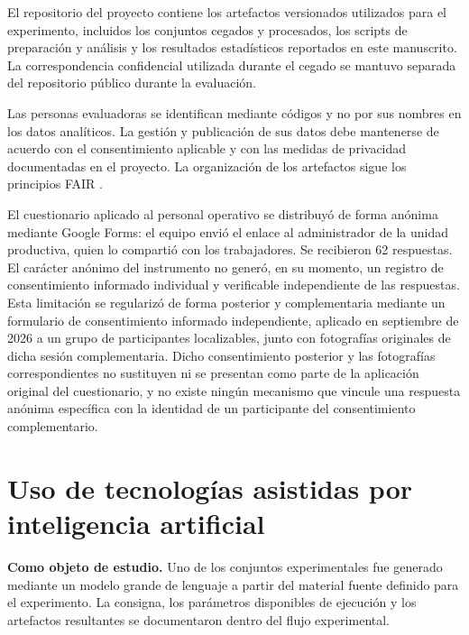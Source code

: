 \documentclass[runningheads]{llncs}
\begin{document}
El repositorio del proyecto contiene los artefactos versionados utilizados para
el experimento, incluidos los conjuntos cegados y procesados, los scripts de
preparaci\'on y an\'alisis y los resultados estad\'isticos reportados en este
manuscrito. La correspondencia confidencial utilizada durante el cegado se
mantuvo separada del repositorio p\'ublico durante la evaluaci\'on.

Las personas evaluadoras se identifican mediante c\'odigos y no por sus nombres
en los datos anal\'iticos. La gesti\'on y publicaci\'on de sus datos debe mantenerse
de acuerdo con el consentimiento aplicable y con las medidas de privacidad
documentadas en el proyecto. La organizaci\'on de los artefactos sigue los
principios FAIR \cite{wilkinson2016}.

El cuestionario aplicado al personal operativo se distribuy\'o de forma
an\'onima mediante Google Forms: el equipo envi\'o el enlace al administrador
de la unidad productiva, quien lo comparti\'o con los trabajadores. Se
recibieron 62 respuestas. El car\'acter an\'onimo del instrumento no gener\'o,
en su momento, un registro de consentimiento informado individual y
verificable independiente de las respuestas. Esta limitaci\'on se
regulariz\'o de forma posterior y complementaria mediante un formulario de
consentimiento informado independiente, aplicado en septiembre de 2026 a un
grupo de participantes localizables, junto con fotograf\'ias originales de
dicha sesi\'on complementaria. Dicho consentimiento posterior y las
fotograf\'ias correspondientes no sustituyen ni se presentan como parte de
la aplicaci\'on original del cuestionario, y no existe ning\'un mecanismo que
vincule una respuesta an\'onima espec\'ifica con la identidad de un
participante del consentimiento complementario.

\section*{Uso de tecnolog\'ias asistidas por inteligencia artificial}

\textbf{Como objeto de estudio.} Uno de los conjuntos experimentales fue generado
mediante un modelo grande de lenguaje a partir del material fuente definido para
el experimento. La consigna, los par\'ametros disponibles de ejecuci\'on y los
artefactos resultantes se documentaron dentro del flujo experimental.
\end{document}
